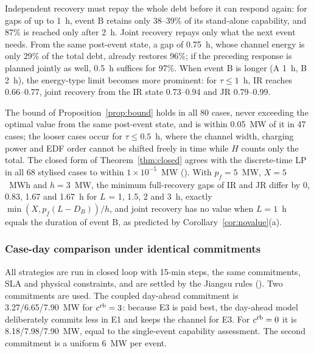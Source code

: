 Independent recovery must repay the whole debt before it can respond again: for gaps of up to 1~h, event B retains
only 38--39\% of its stand-alone capability, and 87\% is reached only after 2~h. Joint recovery repays only what the
next event needs. From the same post-event state, a gap of 0.75~h, whose channel energy is only 29\% of the total debt,
already restores 96\%; if the preceding response is planned jointly as well, 0.5~h suffices for 97\%. When event B is
longer (A 1~h, B 2~h), the energy-type limit becomes more prominent: for $\tau\le1$~h, IR reaches 0.66--0.77, joint
recovery from the IR state 0.73--0.94 and JR 0.79--0.99.

The bound of Proposition~\ref{prop:bound} holds in all 80 cases, never exceeding the optimal value from the same
post-event state, and is within 0.05~MW of it in 47 cases; the looser cases occur for $\tau\le0.5$~h, where the
channel width, charging power and EDF order cannot be shifted freely in time while $H$ counts only the total. The
closed form of Theorem~\ref{thm:closed} agrees with the discrete-time LP in all 68 stylised cases to within
$1\times10^{-5}$~MW (). With $p_f=5$~MW, $X=5$~MWh and $h=3$~MW, the minimum full-recovery gaps of
IR and JR differ by 0, 0.83, 1.67 and 1.67~h for $L$ = 1, 1.5, 2 and 3~h, exactly $\min(X,p_f(L-D_B))/h$, and joint
recovery has no value when $L=1$~h equals the duration of event B, as predicted by Corollary~\ref{cor:novalue}(a).

\subsubsection{Case-day comparison under identical commitments}
\label{sec:res-caseday}

All strategies are run in closed loop with 15-min steps, the same commitments, SLA and physical constraints, and are
settled by the Jiangsu rules (). Two commitments are used. The coupled day-ahead commitment is
3.27/6.65/7.90~MW for $c^{\mathrm{rb}}=3$: because E3 is paid best, the day-ahead model deliberately commits less in E1 and keeps
the channel for E3. For $c^{\mathrm{rb}}=0$ it is 8.18/7.98/7.90~MW, equal to the single-event capability assessment. The second
commitment is a uniform 6~MW per event.

